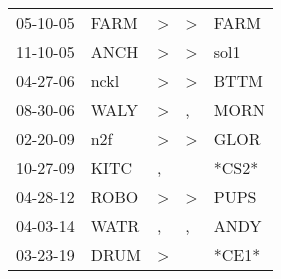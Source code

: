 \begin{supertabular}{lllll}
 05-10-05 &   FARM &     \textgreater &  \textgreater &   FARM \\
 11-10-05 &   ANCH &     \textgreater &  \textgreater &   sol1 \\
 04-27-06 &   nckl &     \textgreater &  \textgreater &   BTTM \\
 08-30-06 &   WALY &     \textgreater &             , &   MORN \\
 02-20-09 &    n2f &     \textgreater &  \textgreater &   GLOR \\
 10-27-09 &   KITC &                , &               &  *CS2* \\
 04-28-12 &   ROBO &     \textgreater &  \textgreater &   PUPS \\
 04-03-14 &   WATR &                , &             , &   ANDY \\
 03-23-19 &   DRUM &     \textgreater &               &  *CE1* \\
\end{supertabular}

